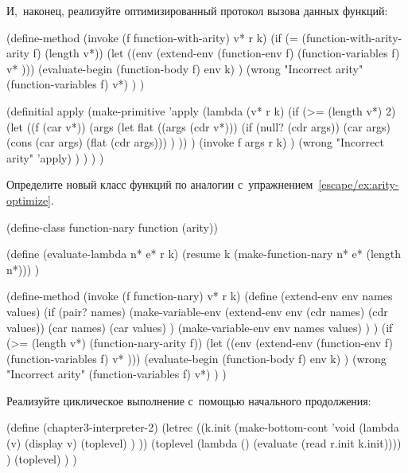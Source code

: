 \noindent
И,~наконец, реализуйте оптимизированный протокол вызова данных функций:

\begin{code:lisp}
(define-method (invoke (f function-with-arity) v* r k)
  (if (= (function-with-arity-arity f) (length v*))
      (let ((env (extend-env (function-env f)
                             (function-variables f) v* )))
        (evaluate-begin (function-body f) env k) )
      (wrong "Incorrect arity" (function-variables f) v*) ) )
\end{code:lisp}



\begin{code:lisp}
(definitial apply
  (make-primitive 'apply
   (lambda (v* r k)
     (if (>= (length v*) 2)
         (let ((f (car v*))
               (args (let flat ((args (cdr v*)))
                       (if (null? (cdr args))
                           (car args)
                           (cons (car args) (flat (cdr args))) ) )) )
           (invoke f args r k) )
         (wrong "Incorrect arity" 'apply) ) ) ) )
\end{code:lisp}



Определите новый класс функций по аналогии
с~упражнением~\ref{escape/ex:arity-optimize}.

\begin{code:lisp}
(define-class function-nary function (arity))

(define (evaluate-lambda n* e* r k)
  (resume k (make-function-nary n* e* (length n*))) )

(define-method (invoke (f function-nary) v* r k)
  (define (extend-env env names values)
    (if (pair? names)
        (make-variable-env
         (extend-env env (cdr names) (cdr values))
         (car names)
         (car values) )
        (make-variable-env env names values) ) )
  (if (>= (length v*) (function-nary-arity f))
      (let ((env (extend-env (function-env f)
                             (function-variables f)
                             v* )))
        (evaluate-begin (function-body f) env k) )
      (wrong "Incorrect arity" (function-variables f) v*) ) )
\end{code:lisp}



Реализуйте циклическое выполнение  с~помощью начального
продолжения:

\begin{code:lisp}
(define (chapter3-interpreter-2)
  (letrec ((k.init (make-bottom-cont
                    'void (lambda (v) (display v)
                                      (toplevel) ) ))
           (toplevel (lambda () (evaluate (read r.init k.init)))) )
    (toplevel) ) )
\end{code:lisp}


